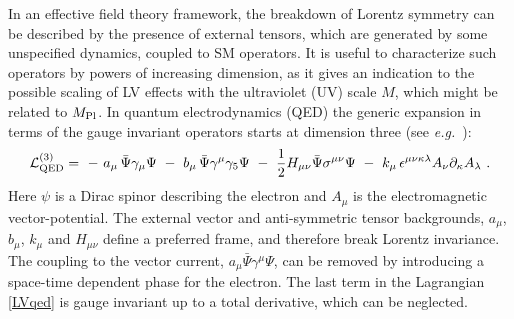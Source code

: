 \documentclass[12pt]{revtex4}
\begin{document}
In an effective field theory framework, the breakdown of Lorentz 
symmetry can be described by the presence of external tensors, which
are generated by some unspecified dynamics, coupled to SM operators. 
It is useful to characterize such operators by powers of increasing
dimension, as it gives an indication to the possible scaling of LV
effects with the ultraviolet (UV) scale $M$, which might be related to $M_{\rm Pl}$. In
quantum electrodynamics (QED) the generic expansion in terms of the
gauge invariant operators starts at dimension three (see {\em e.g.}\ 
\cite{Kost1}): 
%
\begin{equation}
{\cal L}_{\rm QED}^{(3)} =
~-~a_\mu\,  \bar \Psi \gamma_\mu \Psi
~-~ b_\mu\,  \bar \Psi \gamma^\mu \gamma_5 \Psi 
~-~ \frac{1}{2}H_{\mu\nu}\bar \Psi \sigma^{\mu\nu} \Psi
~-~ k_\mu\,  
\epsilon^{\mu\nu\kappa\lambda} A_\nu \partial_\kappa A_\lambda~.
\label{LVqed}
\end{equation}
%
Here $\psi$ is a Dirac spinor describing the electron and $A_\mu$ is the
electromagnetic vector-potential. The external vector and
anti-symmetric tensor backgrounds, $a_{\mu}$, $b_\mu$, $k_\mu$ and
$H_{\mu\nu}$ define a preferred frame, and therefore break Lorentz
invariance. The coupling to the vector current, 
$a_\mu \bar \Psi \gamma^\mu \Psi$, can be removed by introducing a
space-time dependent phase for the electron. The last term in the
Lagrangian \eqref{LVqed} is gauge invariant up to a total derivative,
which can be neglected. 
\end{document}
